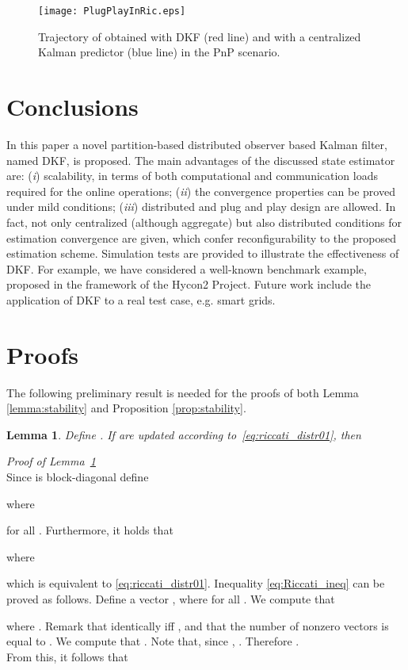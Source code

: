 \documentclass[journal,10pt,draftcls,onecolumn]{IEEEtran}
\newtheorem{lemma}{Lemma}
\begin{document}
\begin{figure}
\centering
\texttt{[image: PlugPlayInRic.eps]}
\label{fig:PlugPlay}
\caption{Trajectory of  obtained with DKF (red line) and with a centralized Kalman predictor (blue line) in the PnP scenario.}
\end{figure}
\section{Conclusions}
\label{sec:conclusions}
In this paper a novel partition-based distributed observer based Kalman filter, named DKF, is proposed. The main advantages of the discussed state estimator are: (\emph{i}) scalability, in terms of both computational and communication loads required for the online operations; (\emph{ii}) the convergence properties can be proved under mild conditions; (\emph{iii}) distributed and plug and play design are allowed. In fact, not only centralized (although aggregate) but also distributed conditions for estimation convergence are given, which confer reconfigurability to the proposed estimation scheme. Simulation tests are provided to illustrate the effectiveness of DKF. For example, we have considered a well-known benchmark example, proposed in the framework of the Hycon2 Project.
Future work include the application of DKF to a real test case, e.g. smart grids.
\appendix
\section{Proofs}
\label{app:proofs}
The following preliminary result is needed for the proofs of both Lemma \ref{lemma:stability} and Proposition \ref{prop:stability}.

\begin{lemma}
Define . If   are updated according to~\eqref{eq:riccati_distr01}, then

\label{prop:distr}
\end{lemma}
\emph{Proof of Lemma~\ref{prop:distr}}\\
Since  is block-diagonal define

where

for all . Furthermore, it holds that

where

which is equivalent to \eqref{eq:riccati_distr01}. Inequality \eqref{eq:Riccati_ineq} can be proved as follows. Define a vector , where  for all . We compute that 

where . Remark that  identically iff , and that the number of nonzero vectors  is equal to . We compute that
. Note that, since , . Therefore
.\\
From this, it follows that
\end{document}
